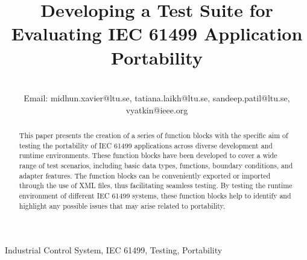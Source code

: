 \documentclass[conference]{IEEEtran}
\begin{document}
\title{Developing a Test Suite for Evaluating IEC 61499 Application Portability  \\


}

\author{








\\ Email: midhun.xavier@ltu.se, tatiana.laikh@ltu.se, sandeep.patil@ltu.se, vyatkin@ieee.org
}



 \maketitle 

\begin{abstract}

This paper presents the creation of a series of function blocks with the specific aim of testing the portability of IEC 61499 applications across diverse development and runtime environments. These function blocks have been developed to cover a wide range of test scenarios, including basic data types, functions, boundary conditions, and adapter features. The function blocks can be conveniently exported or imported through the use of XML files, thus facilitating seamless testing. By testing the runtime environment of different IEC 61499 systems, these function blocks help to identify and highlight any possible issues that may arise related to portability.



\end{abstract}

\begin{IEEEkeywords}
Industrial Control System, IEC 61499, Testing, Portability
\end{IEEEkeywords}
\end{document}
